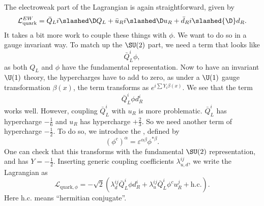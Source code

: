 \documentclass[a4paper]{article}
\begin{document}
The electroweak part of the Lagrangian is again straightforward, given by
\[
  \mathcal{L}_{\mathrm{quark}}^{EW} = \bar{Q}_L i \slashed \D Q_L + \bar{u}_R i \slashed\D u_R + \bar{d}_R i \slashed{\D} d_R.
\]
It takes a bit more work to couple these things with $\phi$. We want to do so in a gauge invariant way. To match up the $\SU(2)$ part, we need a term that looks like
\[
  \bar{Q}_L^i \phi,
\]
as both $Q_L$ and $\phi$ have the fundamental representation. Now to have an invariant $\U(1)$ theory, the hypercharges have to add to zero, as under a $\U(1)$ gauge transformation $\beta(x)$, the term transforms as $e^{i\sum Y_i \beta(x) }$. We see that the term
\[
  \bar{Q}_L^i \phi d_R^i
\]
works well. However, coupling $\bar{Q}_L^i$ with $u_R$ is more problematic. $\bar{Q}_L^i$ has hypercharge $-\frac{1}{6}$ and $u_R$ has hypercharge $+\frac{2}{3}$. So we need another term of hypercharge $-\frac{1}{2}$. To do so, we introduce the , defined by
\[
  (\phi^c)^\alpha = \varepsilon^{\alpha\beta} \phi^{* \beta}.
\]
One can check that this transforms with the fundamental $\SU(2)$ representation, and has $Y = -\frac{1}{2}$. Inserting generic coupling coefficients $\lambda_{u, d}^{ij}$, we write the Lagrangian as
\[
  \mathcal{L}_{\mathrm{quark}, \phi} = - \sqrt{2} (\lambda_d^{ij} \bar{Q}_L^i \phi d_R^i + \lambda_u^{ij} \bar{Q}_L^i \phi^c u_R^j + \mathrm{h.c.}).
\]
Here $\text{h.c.}$ means ``hermitian conjugate''.
\end{document}
